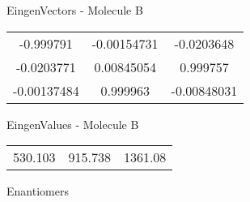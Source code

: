 \begin{multicols}{2}
\begin{center}
\vtab
 EingenVectors - Molecule B     \\
\vtab
\begin{tabular}{|c c c|}
-0.999791	 & 	-0.00154731	 & 	-0.0203648	 \\
-0.0203771	 & 	0.00845054	 & 	0.999757	 \\
-0.00137484	 & 	0.999963	 & 	-0.00848031
\end{tabular}

\vtab
 EingenValues - Molecule B     \\
\vtab
\begin{tabular}{|c c c|}
530.103	 & 	915.738	 & 	1361.08	 \\
\end{tabular}

\end{center}
\end{multicols}
\begin{center}
\vtab
\vtab
\textcolor{NavyBlue}{\Large Enantiomers}
\end{center}

 \newpage

